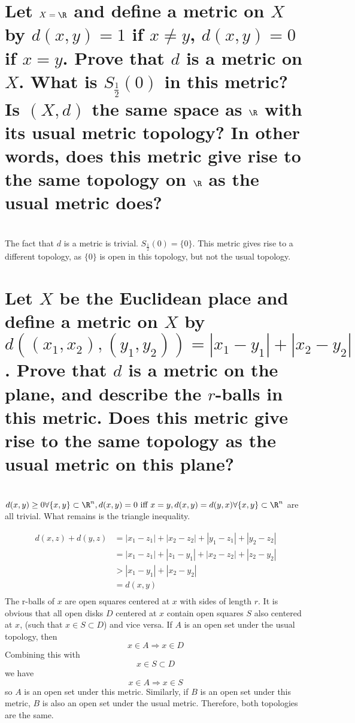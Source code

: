 \begin{parts}
 
 \part{Let $X = \R$ and define a metric on $X$ by $d(x,y) = 1$ if $x \neq y$, $d(x,y) = 0$ if $x = y$. Prove that $d$ is a metric on $X$. What is $S_\frac{1}{2}(0)$ in this metric? Is $(X,d)$ the same space as $\R$ with its usual metric topology? In other words, does this metric give rise to the same topology on $\R$ as the usual metric does?}
 
 
\begin{solution}
 \\The fact that $d$ is a metric is trivial. $S_\frac{1}{2}(0) = \{0\}$. This metric gives rise to a different topology, as $\{0\}$ is open in this topology, but not the usual topology.
\end{solution}

\part{Let $X$ be the Euclidean place and define a metric on $X$ by $d((x_1,x_2),(y_1,y_2)) = |x_1-y_1| + |x_2 - y_2|$. Prove that $d$ is a metric on the plane, and describe the $r$-balls in this metric. Does this metric give rise to the same topology as the usual metric on this plane?}

\begin{solution}
 \\ $d(x,y) \geq 0 \forall \{x,y\} \subset \R^n, d(x,y) = 0 \text{ iff } x = y, d(x,y) = d(y,x) \forall \{x,y\} \subset \R^n$ are all trivial. What remains is the triangle inequality.

\begin{align*}
 d(x,z) + d(y,z) &= |x_1 - z_1| + |x_2 - z_2| + |y_1 - z_1| + |y_2 - z_2| \\
 &= |x_1 - z_1| + |z_1 - y_1| + |x_2 - z_2| + |z_2 - y_2| \\
 &> |x_1 - y_1| + |x_2 - y_2| \\
 &= d(x,y) \\
\end{align*}
The r-balls of $x$ are open squares centered at $x$ with sides of length $r$. It is obvious that all open disks $D$ centered at $x$ contain open squares $S$ also centered at $x$, (such that $x \in S \subset D$) and vice versa. If $A$ is an open set under the usual topology, then
$$x \in A \Rightarrow x \in D$$
Combining this with
$$x \in S \subset D$$
we have
$$x \in A \Rightarrow x \in S$$
so $A$ is an open set under this metric. Similarly, if $B$ is an open set under this metric, $B$ is also an open set under the usual metric. Therefore, both topologies are the same.
\end{solution}
\end{parts}

